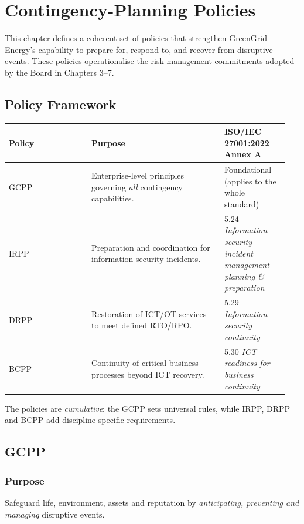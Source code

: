 \chapter{Contingency-Planning Policies}
\label{chap:contingency}

This chapter defines a coherent set of policies that strengthen
GreenGrid Energy’s capability to prepare for, respond to, and
recover from disruptive events.  These policies operationalise the risk-management
commitments adopted by the Board in Chapters 3–7.
\section{Policy Framework}
\label{sec:framework}

\begin{longtable}{@{}p{0.28\linewidth}p{0.45\linewidth}p{0.22\linewidth}@{}}
\toprule
\textbf{Policy} & \textbf{Purpose} & \textbf{ISO/IEC 27001:2022 Annex A}\\
\midrule
\endhead
\ac{GCPP} &
Enterprise-level principles governing \emph{all} contingency capabilities. &
Foundational (applies to the whole standard)\\[2pt]

\ac{IRPP} &
Preparation and coordination for information-security incidents. &
5.24 \textit{Information-security incident management planning \& preparation}\\[2pt]

\ac{DRPP} &
Restoration of ICT/OT services to meet defined RTO/RPO. &
5.29 \textit{Information-security continuity}\\[2pt]

\ac{BCPP} &
Continuity of critical business processes beyond ICT recovery. &
5.30 \textit{ICT readiness for business continuity}\\
\bottomrule
\end{longtable}

The policies are \emph{cumulative}: the GCPP sets universal rules, while
\ac{IRPP}, \ac{DRPP} and \ac{BCPP} add discipline-specific requirements.

\section{\ac{GCPP}}
\subsection*{Purpose}
Safeguard life, environment, assets and reputation by
\emph{anticipating, preventing and managing} disruptive events.

